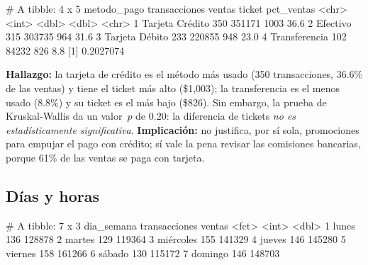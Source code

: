 \begin{rsalida}
# A tibble: 4 x 5
  metodo_pago     transacciones ventas ticket pct_ventas
  <chr>                   <int>  <dbl>  <dbl> <chr>     
1 Tarjeta Crédito           350 351171   1003 36.6%
2 Efectivo                  315 303735    964 31.6%
3 Tarjeta Débito            233 220855    948 23.0%
4 Transferencia             102  84232    826 8.8%
[1] 0.2027074
\end{rsalida}

\textbf{Hallazgo:} la tarjeta de crédito es el método más usado (350
transacciones, 36.6\% de las ventas) y tiene el ticket más alto (\$1,003);
la transferencia es el menos usado (8.8\%) y su ticket es el más bajo
(\$826). Sin embargo, la prueba de Kruskal-Wallis da un valor~$p$ de
0.20: la diferencia de tickets \emph{no es estadísticamente
significativa}. \textbf{Implicación:} no justifica, por sí sola, promociones
para empujar el pago con crédito; sí vale la pena revisar las comisiones
bancarias, porque 61\% de las ventas se paga con tarjeta.

\subsection{Días y horas}
\label{sec:m09-dia-hora}


\begin{rsalida}
# A tibble: 7 x 3
  dia_semana transacciones ventas
  <fct>              <int>  <dbl>
1 lunes                136 128878
2 martes               129 119364
3 miércoles            155 141329
4 jueves               146 145280
5 viernes              158 161266
6 sábado               130 115172
7 domingo              146 148703
\end{rsalida}

